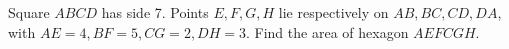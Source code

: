 Square $ ABCD $ has side 7. Points $ E,F,G,H $ lie respectively on $ AB,BC,CD,DA $, with $ AE=4,BF=5,CG=2,DH=3 $. Find the area of hexagon $ AEFCGH $.
